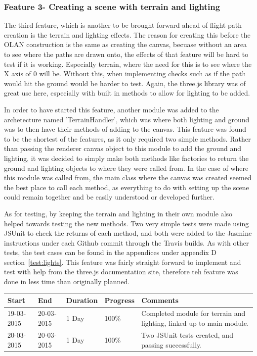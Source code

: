 \subsubsection{Feature 3- Creating a scene with terrain and lighting}
The third feature, which is another to be brought forward ahead of flight path creation is the terrain and lighting effects. The reason for creating this before the OLAN construction is the same as creating the canvas, becuase without an area to see where the paths are drawn onto, the effects of that feature will be hard to test if it is working. Especially terrain, where the need for this is to see where the X axis of 0 will be. Without this, when implementing checks such as if the path would hit the ground would be harder to test. Again, the three.js library was of great use here, especially with built in methods to allow for lighting to be added.

In order to have started this feature, another module was added to the archetecture named 'TerrainHandler', which was where both lighting and ground was to then have their methods of adding to the canvas. This feature was found to be the shortest of the features, as it only required two simple methods. Rather than passing the renderer canvas object to this module to add the ground and lighting, it was decided to simply make both methods like factories to return the ground and lighting objects to where they were called from. In the case of where this module was called from, the main class where the canvas was created seemed the best place to call each method, as everything to do with setting up the scene could remain together and be easily understood or developed further.

As for testing, by keeping the terrain and lighting in their own module also helped towards testing the new methods. Two very simple tests were made using JSUnit to check the returns of each method, and both were added to the Jasmine instructions under each Github commit through the Travis builds. As with other tests, the test cases can be found in the appendices under appendix D section~\ref{test:lights}. This feature was fairly straight forward to implement and test with help from the three.js documentation site, therefore teh feature was done in less time than originally planned.

\begin{table}[h]
\begin{tabular}{|l|l|l|l|p{7cm}|}
\hline
\textbf{Start} & \textbf{End} & \textbf{Duration} & \textbf{Progress} & \textbf{Comments}                                                                                                     \\ \hline
19-03-2015     & 20-03-2015   & 1 Day            & 100\%             &  Completed module for terrain and lighting, linked up to main module.\\ \hline
20-03-2015     & 20-03-2015   & 1 Day            & 100\%             &  Two JSUnit tests created, and passing successfully.\\ \hline
\end{tabular}
\end{table}

